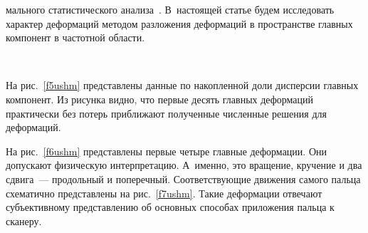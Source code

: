 \begin{multicols}{2}

\noindent
мального статистического 
анализа~\cite{14ushm}. В~настоящей статье будем исследовать характер деформаций 
методом разложения деформаций в пространстве главных компонент в частотной области. 

\begin{figure*} %
\vspace*{1pt}
\begin{center}
\mbox{%
\epsfxsize=160.357mm
}
\end{center}
\vspace*{-9pt}
\end{figure*}

На рис.~\ref{f5ushm} представлены данные по накопленной доли дис\-пер\-сии главных 
компонент. Из рисунка видно, что первые десять главных деформаций прак\-ти\-чески без 
потерь приближают полученные численные решения для дефор\-маций.
{

}
      
      На рис.~\ref{f6ushm} представлены первые четыре главные деформации. Они 
допускают физическую интерпретацию. А~именно, это вращение, кручение и два 
сдвига~--- продольный и поперечный. Соответствующие движения самого пальца 
схематично представлены на рис.~\ref{f7ushm}. Такие деформации отвечают 
субъективному представлению об основных способах приложения пальца к сканеру.


\begin{figure*} %
\vspace*{1pt}
\begin{center}
\mbox{%
\epsfxsize=163.878mm
}
\end{center}
\vspace*{-9pt}
\end{figure*}
      \begin{figure*} %
      \vspace*{1pt}
\begin{center}
\mbox{%
\epsfxsize=162.137mm
}
\end{center}
\vspace*{-9pt}
      \end{figure*}


\end{multicols}
